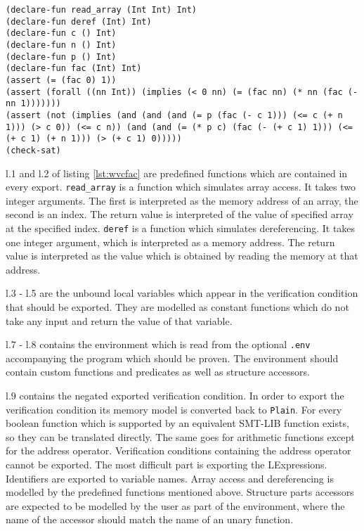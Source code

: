 \documentclass[12pt]{article}
\begin{document}
\begin{minipage}{\linewidth}
\begin{lstlisting}[style=c0, caption=an exported verification condition, label=lst:wvcfac]
(declare-fun read_array (Int Int) Int)
(declare-fun deref (Int) Int)
(declare-fun c () Int)
(declare-fun n () Int)
(declare-fun p () Int)
(declare-fun fac (Int) Int)
(assert (= (fac 0) 1))
(assert (forall ((nn Int)) (implies (< 0 nn) (= (fac nn) (* nn (fac (- nn 1)))))))
(assert (not (implies (and (and (and (= p (fac (- c 1))) (<= c (+ n 1))) (> c 0)) (<= c n)) (and (and (= (* p c) (fac (- (+ c 1) 1))) (<= (+ c 1) (+ n 1))) (> (+ c 1) 0)))))
(check-sat)
\end{lstlisting}
\end{minipage}

l.1 and l.2 of listing \ref{lst:wvcfac} are predefined functions which are contained in every export.
\texttt{read\_array} is a function which simulates array access. It takes two integer arguments.
The first is interpreted as the memory address of an array, the second is an index.
The return value is interpreted of the value of specified array at the specified index.
\texttt{deref} is a function which simulates dereferencing.
It takes one integer argument, which is interpreted as a memory address.
The return value is interpreted as the value which is obtained by reading the memory at that address.

l.3 - l.5 are the unbound local variables which appear in the verification condition that should be exported.
They are modelled as constant functions which do not take any input and return the value of that variable.

l.7 - l.8 contains the environment which is read from the optional \texttt{.env} accompanying the program which should be proven.
The environment should contain custom functions and predicates as well as structure accessors.

l.9 contains the negated exported verification condition.
In order to export the verification condition its memory model is converted back to \texttt{Plain}.
For every boolean function which is supported by \verifyc an equivalent SMT-LIB function exists, so they can be translated directly.
The same goes for arithmetic functions except for the address operator.
Verification conditions containing the address operator cannot be exported.
The most difficult part is exporting the LExpressions.
Identifiers are exported to variable names.
Array access and dereferencing is modelled by the predefined functions mentioned above.
Structure parts accessors are expected to be modelled by the user as part of the environment,
where the name of the accessor should match the name of an unary function.
\end{document}
